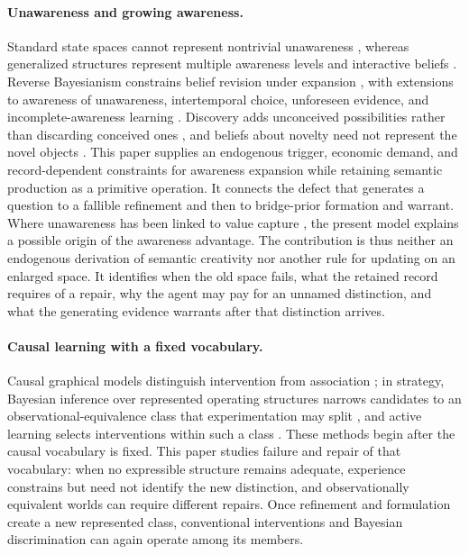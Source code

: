 \documentclass[11pt]{article}
\theoremstyle{definition}
\begin{document}
\paragraph{Unawareness and growing awareness.}
Standard state spaces cannot represent nontrivial unawareness \citep{DekelLipmanRustichini1998}, whereas generalized structures represent multiple awareness levels and interactive beliefs \citep{HeifetzMeierSchipper2006,HeifetzMeierSchipper2013}.
Reverse Bayesianism constrains belief revision under expansion \citep{KarniViero2013}, with extensions to awareness of unawareness, intertemporal choice, unforeseen evidence, and incomplete-awareness learning \citep{KarniViero2017,Viero2021,Piermont2021,GrantMeneghelTourky2022}.
Discovery adds unconceived possibilities rather than discarding conceived ones \citep{Schipper2021}, and beliefs about novelty need not represent the novel objects \citep{Schipper2025}.
This paper supplies an endogenous trigger, economic demand, and record-dependent constraints for awareness expansion while retaining semantic production as a primitive operation.
It connects the defect that generates a question to a fallible refinement and then to bridge-prior formation and warrant.
Where unawareness has been linked to value capture \citep{BryanRyallSchipper2022}, the present model explains a possible origin of the awareness advantage.
The contribution is thus neither an endogenous derivation of semantic creativity nor another rule for updating on an enlarged space.
It identifies when the old space fails, what the retained record requires of a repair, why the agent may pay for an unnamed distinction, and what the generating evidence warrants after that distinction arrives.

\paragraph{Causal learning with a fixed vocabulary.}
Causal graphical models distinguish intervention from association \citep{Pearl2009,SpirtesEtAl2000}; in strategy, Bayesian inference over represented operating structures narrows candidates to an observational-equivalence class that experimentation may split \citep{Ryall2009}, and active learning selects interventions within such a class \citep{HeGeng2008}.
These methods begin after the causal vocabulary is fixed.
This paper studies failure and repair of that vocabulary: when no expressible structure remains adequate, experience constrains but need not identify the new distinction, and observationally equivalent worlds can require different repairs.
Once refinement and formulation create a new represented class, conventional interventions and Bayesian discrimination can again operate among its members.
\end{document}
